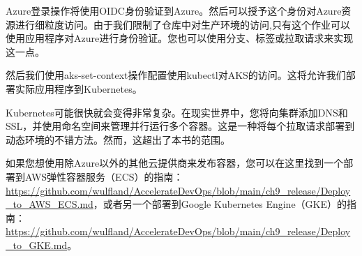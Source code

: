 
Azure登录操作将使用OIDC身份验证到Azure。然后可以授予这个身份对Azure资源进行细粒度访问。由于我们限制了仓库中对生产环境的访问,只有这个作业可以使用应用程序对Azure进行身份验证。您也可以使用分支、标签或拉取请求来实现这一点。

然后我们使用aks-set-context操作配置使用kubectl对AKS的访问。这将允许我们部署实际应用程序到Kubernetes。


Kubernetes可能很快就会变得非常复杂。在现实世界中，您将向集群添加DNS和SSL，并使用命名空间来管理并行运行多个容器。这是一种将每个拉取请求部署到动态环境的不错方法。然而，这超出了本书的范围。

如果您想使用除Azure以外的其他云提供商来发布容器，您可以在这里找到一个部署到AWS弹性容器服务（ECS）的指南：\url{https://github.com/wulfland/AccelerateDevOps/blob/main/ch9_release/Deploy_to_AWS_ECS.md}，或者另一个部署到Google Kubernetes Engine（GKE）的指南：\url{https://github.com/wulfland/AccelerateDevOps/blob/main/ch9_release/Deploy_to_GKE.md}。